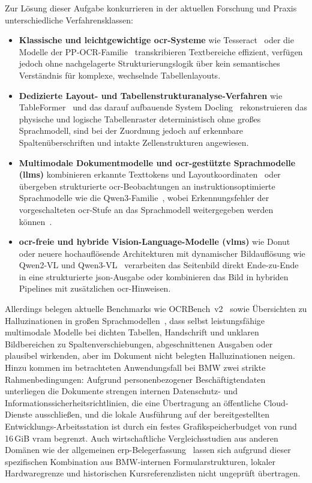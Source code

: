 Zur Lösung dieser Aufgabe konkurrieren in der aktuellen Forschung und Praxis unterschiedliche Verfahrensklassen:
\begin{itemize}
  \item \textbf{Klassische und leichtgewichtige \ac{ocr}-Systeme} wie Tesseract~\cite{Smith2007Tesseract} oder die Modelle der PP-OCR-Familie~\cite{Li2022PPOCRv3} transkribieren Textbereiche effizient, verfügen jedoch ohne nachgelagerte Strukturierungslogik über kein semantisches Verständnis für komplexe, wechselnde Tabellenlayouts.
  \item \textbf{Dedizierte Layout- und Tabellenstrukturanalyse-Verfahren} wie TableFormer~\cite{Nassar2022TableFormer} und das darauf aufbauende System Docling~\cite{Auer2024DoclingSelection} rekonstruieren das physische und logische Tabellenraster deterministisch ohne großes Sprachmodell, sind bei der Zuordnung jedoch auf erkennbare Spaltenüberschriften und intakte Zellenstrukturen angewiesen.
  \item \textbf{Multimodale Dokumentmodelle und \ac{ocr}-gestützte Sprachmodelle (\acp{llm})} kombinieren erkannte Texttokens und Layoutkoordinaten~\cite{Xu2020LayoutLM,Huang2022LayoutLMv3} oder übergeben strukturierte \ac{ocr}-Beobachtungen an instruktionsoptimierte Sprachmodelle wie die Qwen3-Familie~\cite{Yang2025Qwen3}, wobei Erkennungsfehler der vorgeschalteten \ac{ocr}-Stufe an das Sprachmodell weitergegeben werden können~\cite{vanStrien2020OCRQuality}.
  \item \textbf{\ac{ocr}-freie und hybride Vision-Language-Modelle (\acp{vlm})} wie Donut~\cite{Kim2022Donut} oder neuere hochauflösende Architekturen mit dynamischer Bildauflösung wie Qwen2-VL und Qwen3-VL~\cite{Wang2024Qwen2VL,QwenSelectionVisionCard} verarbeiten das Seitenbild direkt Ende-zu-Ende in eine strukturierte \ac{json}-Ausgabe oder kombinieren das Bild in hybriden Pipelines mit zusätzlichen \ac{ocr}-Hinweisen.
\end{itemize}

Allerdings belegen aktuelle Benchmarks wie OCRBench~v2~\cite{Fu2025OCRBenchV2} sowie Übersichten zu Halluzinationen in großen Sprachmodellen~\cite{Huang2024Hallucination}, dass selbst leistungsfähige multimodale Modelle bei dichten Tabellen, Handschrift und unklaren Bildbereichen zu Spaltenverschiebungen, abgeschnittenen Ausgaben oder plausibel wirkenden, aber im Dokument nicht belegten Halluzinationen neigen. Hinzu kommen im betrachteten Anwendungsfall bei BMW zwei strikte Rahmenbedingungen: Aufgrund personenbezogener Beschäftigtendaten unterliegen die Dokumente strengen internen Datenschutz- und Informationssicherheitsrichtlinien, die eine Übertragung an öffentliche Cloud-Dienste ausschließen, und die lokale Ausführung auf der bereitgestellten Entwicklungs-Arbeitsstation ist durch ein festes Grafikspeicherbudget von rund \mbox{16\,GiB} \ac{vram} begrenzt. Auch wirtschaftliche Vergleichsstudien aus anderen Domänen wie der allgemeinen \ac{erp}-Belegerfassung~\cite{Lertyosbordin2026ERP} lassen sich aufgrund dieser spezifischen Kombination aus BMW-internen Formularstrukturen, lokaler Hardwaregrenze und historischen Kursreferenzlisten nicht ungeprüft übertragen.

